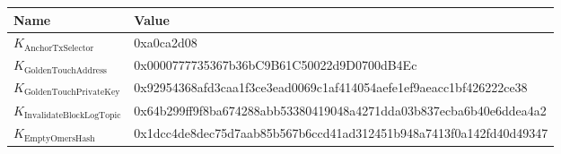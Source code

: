 \documentclass[9pt,oneside]{amsart}
\begin{document}
\begin{tabu}{l l}
\toprule
Name &  \quad \quad Value \\
\midrule
$K_{\mathrm{AnchorTxSelector}}$ &  \quad \quad 0xa0ca2d08 \\
$K_{\mathrm{GoldenTouchAddress}}$ &  \quad \quad 0x0000777735367b36bC9B61C50022d9D0700dB4Ec  \\
$K_{\mathrm{GoldenTouchPrivateKey}}$ & \quad \quad 0x92954368afd3caa1f3ce3ead0069c1af414054aefe1ef9aeacc1bf426222ce38 \\
$K_{\mathrm{InvalidateBlockLogTopic}}$ & \quad \quad 0x64b299ff9f8ba674288abb53380419048a4271dda03b837ecba6b40e6ddea4a2 \\
$K_{\mathrm{EmptyOmersHash}}$ & \quad \quad 0x1dcc4de8dec75d7aab85b567b6ccd41ad312451b948a7413f0a142fd40d49347   \quad \quad \quad \quad \\
\bottomrule
\end{tabu}
\end{document}
